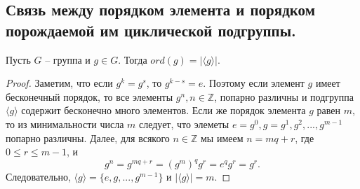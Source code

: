 \subsection{Связь между порядком элемента и порядком порождаемой им циклической подгруппы.}
\begin{statement} \label{statement1}
    Пусть $G$ -- группа и $g \in G$. Тогда $ord(g) = |\langle g \rangle|$.
    \begin{proof}
        Заметим, что если $g^k = g^s$, то $g^{k-s} = e$. Поэтому если элемент $g$ имеет бесконечный порядок, то все элементы $g^n, n \in \mathbb{Z}$, попарно различны и подгруппа $\langle g \rangle$ содержит бесконечно много элементов. Если же порядок элемента $g$ равен $m$, то из минимальности числа $m$ следует, что элеметы $e = g^0, g = g^1, g^2,..., g^{m-1}$ попарно различны. Далее, для всякого $n \in \mathbb{Z}$ мы имеем $n = mq + r$, где $0 \leqslant r \leqslant m-1$, и
        \[
            g^n = g^{mq + r} = (g^m)^q g^r = e^q g^r = g^r.
        \]
        Следовательно, $\langle g \rangle = \{e, g, ..., g^{m-1}\}$ и $|\langle g \rangle | = m$.
    \end{proof}
\end{statement}
